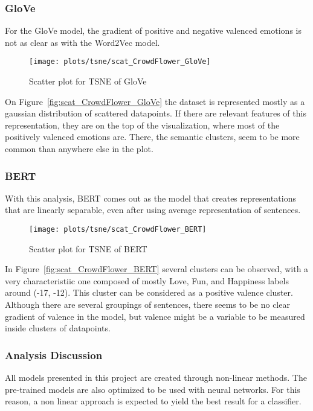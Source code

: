 \subsubsection{GloVe}
For the GloVe model, the gradient of positive and negative valenced emotions is not as clear as with the Word2Vec model.
\begin{figure}[H]
  \texttt{[image: plots/tsne/scat\_CrowdFlower\_GloVe]}
  \centering
  \caption{Scatter plot for TSNE of GloVe}
\end{figure}\label{fig:scat_CrowdFlower_GloVe}
On Figure~\ref{fig:scat_CrowdFlower_GloVe} the dataset is represented mostly as a gaussian distribution of scattered datapoints. If there are relevant features of this representation, they are on the top of the visualization, where most of the positively valenced emotions are. There, the semantic clusters, seem to be more common than anywhere else in the plot.

\subsubsection{BERT}
With this analysis, BERT comes out as the model that creates representations that are linearly separable, even after using average representation of sentences.
\begin{figure}[H]
  \texttt{[image: plots/tsne/scat\_CrowdFlower\_BERT]}
  \centering
  \caption{Scatter plot for TSNE of BERT}
\end{figure}\label{fig:scat_CrowdFlower_BERT}
In Figure~\ref{fig:scat_CrowdFlower_BERT} several clusters can be observed, with a very characteristiic one composed of mostly Love, Fun, and Happiness labels around (-17, -12). This cluster can be considered as a positive valence cluster. Although there are several groupings of sentences, there seems to be no clear gradient of valence in the model, but valence might be a variable to be measured inside clusters of datapoints.

\subsubsection{Analysis Discussion}
All models presented in this project are created through non-linear methods. The pre-trained models are also optimized to be used with neural networks. For this reason, a non linear approach is expected to yield the best result for a classifier.

